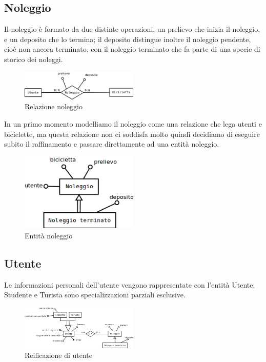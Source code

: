 \documentclass[a4paper,twoside]{article}
\begin{document}
\subsection{Noleggio}
Il noleggio è formato da due distinte operazioni, un prelievo che inizia il noleggio, e un deposito che lo termina; il deposito distingue inoltre il noleggio pendente, cioè non ancora terminato, con il noleggio terminato che fa parte di una specie di storico dei noleggi.
\begin{figure}[H]
 \centering
  \includegraphics[width=0.5\textwidth]{Immagini-Grafici/Concettuale01.png}
\caption{Relazione noleggio}
\end{figure}
In un primo momento modelliamo il noleggio come una relazione che lega utenti e biciclette, ma questa relazione non ci soddisfa molto quindi decidiamo di eseguire subito il raffinamento e passare direttamente ad una entità noleggio.
\begin{figure}[H]
 \centering
  \includegraphics[width=0.5\textwidth]{Immagini-Grafici/Concettuale02.png}
\caption{Entità noleggio}
\end{figure}

\subsection{Utente}
Le informazioni personali dell'utente vengono rappresentate con l'entità Utente; Studente e Turista sono specializzazioni parziali esclusive.
\begin{figure}[H]
 \centering
  \includegraphics[width=0.5\textwidth]{Immagini-Grafici/Concettuale03.png}
\caption{Reificazione di utente}
\end{figure}
\end{document}

